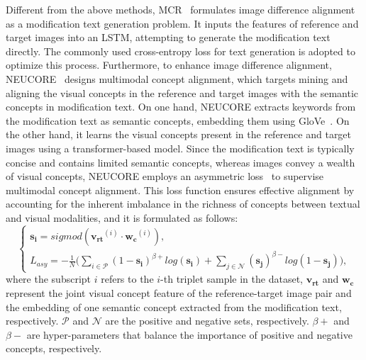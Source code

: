 Different from the above methods, MCR~\cite{zhang2021mcr} formulates image difference alignment as a modification text generation problem. It inputs the features of reference and target images into an LSTM, attempting to generate the modification text directly. The commonly used cross-entropy loss for text generation is adopted to optimize this process. Furthermore, to enhance image difference alignment, NEUCORE~\cite{zhao2024neucore} designs multimodal concept alignment, which targets mining and aligning the visual concepts in the reference and target images with the semantic concepts in modification text. On one hand, NEUCORE extracts keywords from the modification text as semantic concepts, embedding them using GloVe~\cite{pennington2014glove}. On the other hand, it learns the visual concepts present in the reference and target images using a transformer-based model.
Since the modification text is typically concise and contains limited semantic concepts, whereas images convey a wealth of visual concepts, NEUCORE employs an asymmetric loss~\cite{ridnik2021asymmetric} to supervise multimodal concept alignment. This loss function ensures effective alignment by accounting for the inherent imbalance in the richness of concepts between textual and visual modalities, and it is formulated as follows:
\begin{equation}
\left\{
\begin{array}{ll}
\mathbf{s_i} = sigmod(\mathbf{v_{rt}}^{(i)}\cdot \mathbf{w_c}^{(i)} ), \\
L_{asy} = -\frac{1}{N} \big( \sum_{i \in \mathcal{P}}^{}(1-\mathbf{s_i})^{\beta+}  log(\mathbf{s_i}) + \sum_{j\in \mathcal{N}}^{}(\mathbf{s_j})^{\beta-}  log(1-\mathbf{s_j}) \big),
\end{array}
\right.
\label{eq:as_loss}
\end{equation}
where the subscript $i$ refers to the $i$-th triplet sample in the dataset, $\mathbf{v_{rt}}$ and $\mathbf{w_c}$ represent the joint visual concept feature of the reference-target image pair and the embedding of one semantic concept extracted from the modification text, respectively. $\mathcal{P}$ and $\mathcal{N}$ are the positive and negative sets, respectively. ${\beta+}$ and ${\beta-}$ are hyper-parameters that balance the importance of positive and negative concepts, respectively. 

